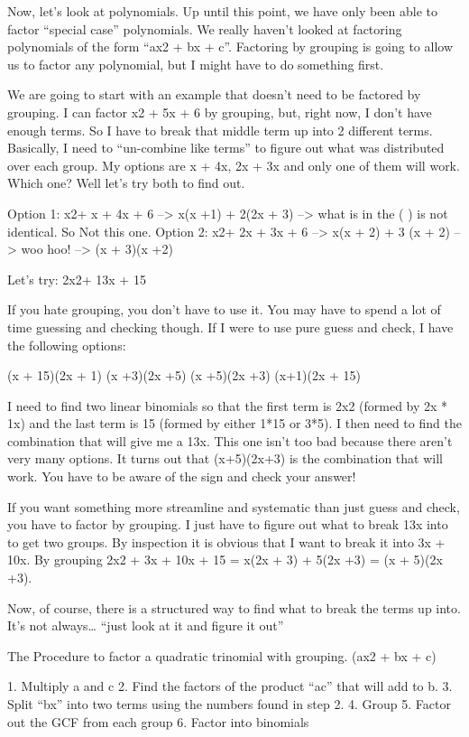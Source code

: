 Now, let's look at polynomials. Up until this point, we have only been able to factor ``special case'' polynomials. We really haven't looked at factoring polynomials of the form ``ax2 + bx + c''. Factoring by grouping is going to allow us to factor any polynomial, but I might have to do something first. 

We are going to start with an example that doesn't need to be factored by grouping. I can factor x2 + 5x + 6 by grouping, but, right now, I don't have enough terms. So I have to break that middle term up into 2 different terms. Basically, I need to ``un-combine like terms'' to figure out what was distributed over each group. My options are x + 4x, 2x + 3x and only one of them will work. Which one? Well let's try both to find out.

Option 1: x2+ x + 4x + 6 --> x(x +1) + 2(2x + 3) --> what is in the ( ) is not identical. So Not this one.
Option 2: x2+ 2x + 3x + 6 --> x(x + 2) + 3 (x + 2) --> woo hoo! --> (x + 3)(x +2)

Let's try: 2x2+ 13x + 15

If you hate grouping, you don't have to use it. You may have to spend a lot of time guessing and checking though. If I were to use pure guess and check, I have the following options: 

(x + 15)(2x + 1)		(x +3)(2x +5)		(x +5)(2x +3)		(x+1)(2x + 15)

I need to find two linear binomials so that the first term is 2x2 (formed by 2x * 1x) and the last term is 15 (formed by either 1*15 or 3*5). I then need to find the combination that will give me a 13x. This one isn't too bad because there aren't very many options. It turns out that (x+5)(2x+3) is the combination that will work. You have to be aware of the sign and check your answer!

If you want something more streamline and systematic than just guess and check, you have to factor by grouping. I just have to figure out what to break 13x into to get two groups. By inspection it is obvious that I want to break it into 3x + 10x. By grouping 2x2 + 3x + 10x + 15 = x(2x + 3) + 5(2x +3) = (x + 5)(2x +3).

Now, of course, there is a structured way to find what to break the terms up into. It's not always\ldots{} ``just look at it and figure it out''

The Procedure to factor a quadratic trinomial with grouping. (ax2 + bx + c)

1. Multiply a and c
2. Find the factors of the product ``ac'' that will add to b.
3. Split ``bx'' into two terms using the numbers found in step 2.
4. Group
5. Factor out the GCF from each group
6. Factor into binomials


